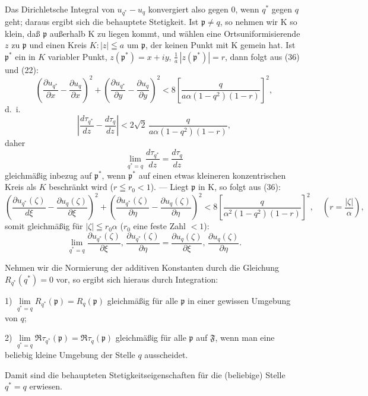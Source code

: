 \documentclass{article}
\begin{document}
Das Dirichletsche Integral von $u_{q^*} - u_q$ konvergiert also gegen $0$, wenn $q^*$ gegen $q$ geht; daraus ergibt sich die behauptete Stetigkeit. Ist $\mathfrak{p} \neq q$, so nehmen wir $\mathrm{K}$ so klein, daß $\mathfrak{p}$ außerhalb $\mathrm{K}$ zu liegen kommt, und wählen eine Ortsuniformisierende $z$ zu $\mathfrak{p}$ und einen Kreis $K\colon |z| \leqq a$ um $\mathfrak{p}$, der keinen Punkt mit $\mathrm{K}$ gemein hat. Ist $\mathfrak{p}^*$ ein in $K$ variabler Punkt, $z(\mathfrak{p}^*) = x + iy$, $\frac{1}{a}\,|z(\mathfrak{p}^*)| = r$, dann folgt aus (36) und (22):
\[ \left( \frac{\partial u_{q^*}}{\partial x} - \frac{\partial u_q}{\partial x} \right)^2 + \left( \frac{\partial u_{q^*}}{\partial y} - \frac{\partial u_q}{\partial y} \right)^2 < 8 \left[ \frac{q}{a\alpha(1 - q^2)(1 - r)} \right]^2, \]
d.~i.
\[ \left| \frac{d\tau_{q^*}}{dz} - \frac{d\tau_q}{dz} \right| < 2\sqrt{2} \, \frac{q}{a\alpha(1 - q^2)(1 - r)}, \]
daher
\[ \lim_{q^* = q} \frac{d\tau_{q^*}}{dz} = \frac{d\tau_q}{dz} \tag{37} \]
gleichmäßig inbezug auf $\mathfrak{p}^*$, wenn $\mathfrak{p}^*$ auf einen etwas kleineren konzentrischen Kreis als $K$ beschränkt wird ($r \leqq r_0 < 1$). --- Liegt $\mathfrak{p}$ in $\mathrm{K}$, so folgt aus (36):
\[ \left( \frac{\partial u_{q^*}(\zeta)}{d\xi} - \frac{\partial u_q(\zeta)}{\partial\xi} \right)^2 + \left( \frac{\partial u_{q^*}(\zeta)}{\partial\eta} - \frac{\partial u_q(\zeta)}{\partial\eta} \right)^2 < 8 \left[ \frac{q}{\alpha^2(1 - q^2)(1 - r)} \right]^2, \quad \left( r = \frac{|\zeta|}{\alpha} \right), \]
somit gleichmäßig für $|\zeta| \leqq r_0\alpha$ ($r_0$ eine feste Zahl $< 1$):
\[ \lim_{q^* = q} \frac{\partial u_{q^*}(\zeta)}{\partial\xi}, \, \frac{\partial u_{q^*}(\zeta)}{\partial\eta} = \frac{\partial u_q(\zeta)}{\partial\xi}, \, \frac{\partial u_q(\zeta)}{\partial\eta}. \]

Nehmen wir die Normierung der additiven Konstanten durch die Gleichung $R_{q^*}(q^*) = 0$ vor, so ergibt sich hieraus durch Integration:

1) $\lim\limits_{q^* = q} R_{q^*}(\mathfrak{p}) = R_q(\mathfrak{p})$ gleichmäßig für alle $\mathfrak{p}$ in einer gewissen Umgebung von $q$;

2) $\lim\limits_{q^* = q} \Re\tau_{q^*}(\mathfrak{p}) = \Re\tau_q(\mathfrak{p})$ gleichmäßig für alle $\mathfrak{p}$ auf $\mathfrak{F}$, wenn man eine beliebig kleine Umgebung der Stelle $q$ ausscheidet.

Damit sind die behaupteten Stetigkeitseigenschaften für die (beliebige) Stelle $q^* = q$ erwiesen.
\end{document}
